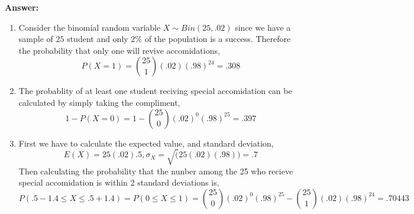 \documentclass[12pt]{article}
\theoremstyle{homework}
\begin{document}
\begin{enumerate}
\textbf{Answer:} 
\begin{enumerate}
\item Consider the binomial random variable $X\sim Bin(25, .02)$ since we have a sample of $25$ student and only 2\% of the population is a success. Therefore the probability that only one will revive accomidations,
\begin{equation*}
 P(X = 1) = {25 \choose 1}(.02)(.98)^{24}=.308
\end{equation*}





\item The probablity of at least one student reciving special accomidation can be calculated by simply taking the compliment,
\begin{equation*}
  1-P(X = 0) = 1-{25 \choose 0}(.02)^0(.98)^{25}=.397
\end{equation*}
\addtocounter{enumii}{1}



\item First we have to calculate the expected value, and standard deviation,
\begin{equation*}
  E(X) = 25(.02).5,\sigma_X = \sqrt(25(.02)(.98)) = .7
\end{equation*}
Then calculating the probability that the nunber among the 25 who recieve special accomidation is within 2 standard deviations is,
\begin{equation*}
  P(.5 - 1.4\le X \le .5 + 1.4) = P(0 \le X \le 1) = {25 \choose 0}(.02)^0(.98)^{25} - {25 \choose 1}(.02)(.98)^{24} = .70443
\end{equation*}
\end{enumerate}
\vspace{.5in}








\end{enumerate}
\end{document}
